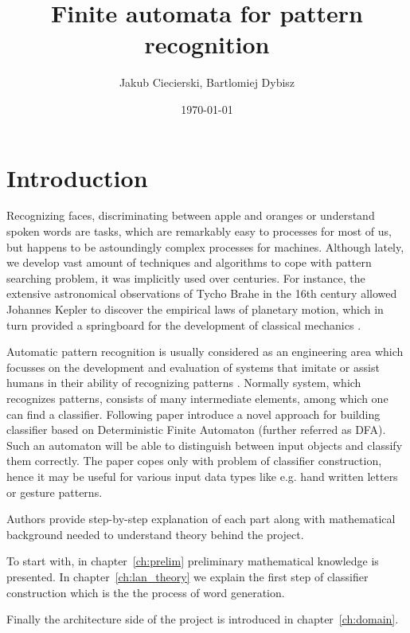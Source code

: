\documentclass{mini}
\title{Finite automata for pattern recognition}
\author{Jakub Ciecierski, Bartlomiej Dybisz}
\date{\today}
\begin{document}
\maketitle
\tableofcontents

\chapter*{Introduction}
Recognizing faces, discriminating between apple and oranges or understand spoken words are tasks, which are remarkably easy to processes for most of us, but happens to be astoundingly complex processes for machines. Although lately, we develop vast amount of techniques and algorithms to cope with pattern searching problem, it was implicitly used over centuries. For instance, the extensive astronomical observations of Tycho Brahe in the 16th century allowed Johannes Kepler to discover the empirical laws of
planetary motion, which in turn provided a springboard for the development of classical mechanics \cite{bishop_book}.

Automatic pattern recognition is usually considered as an engineering area which focusses on the development and evaluation of systems that imitate or assist humans in their ability of recognizing patterns \cite{duch_uuu}. Normally system, which recognizes patterns, consists of many intermediate elements, among which one can find a classifier. Following paper introduce a novel approach for building classifier based on  Deterministic Finite Automaton (further referred as DFA). Such an automaton will be able to distinguish between input objects and classify them correctly. The paper copes only with problem of classifier construction, hence it may be useful for various input data types like e.g. hand written letters or gesture patterns. 

Authors provide step-by-step explanation of each part along with mathematical background needed to understand theory behind the project.

To start with, in chapter~\ref{ch:prelim} preliminary mathematical knowledge is presented. In chapter~\ref{ch:lan_theory} we explain the first step of classifier construction which is the the process of word generation.

Finally the architecture side of the project is introduced in chapter~\ref{ch:domain}.
\end{document}
